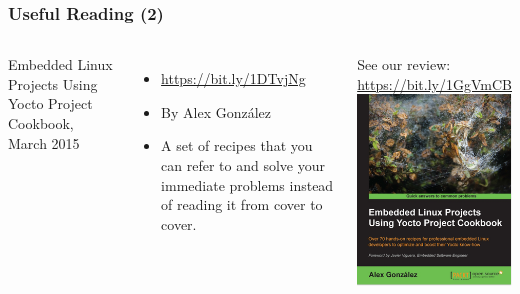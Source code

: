 \begin{frame}
  \frametitle{Useful Reading (2)}
  \begin{columns}
    Embedded Linux Projects Using Yocto Project Cookbook, March 2015
    \begin{itemize}
    \item \url{https://bit.ly/1DTvjNg}
    \item By Alex González
    \item A set of recipes that you can refer to and solve your
          immediate problems instead of reading it from cover to cover. 
    \end{itemize}
    See our review: \url{https://bit.ly/1GgVmCB}
    \includegraphics[width=\textwidth]{slides/yocto-resources/ELPYPC.jpg}
  \end{columns}
\end{frame}
